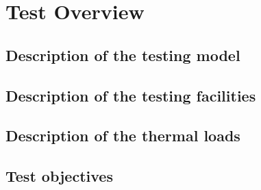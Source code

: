 \section{Test Overview} \label{sec:Test-overview}

\subsection{Description of the testing model}





\subsection{Description of the testing facilities}





\subsection{Description of the thermal loads}





\subsection{Test objectives}